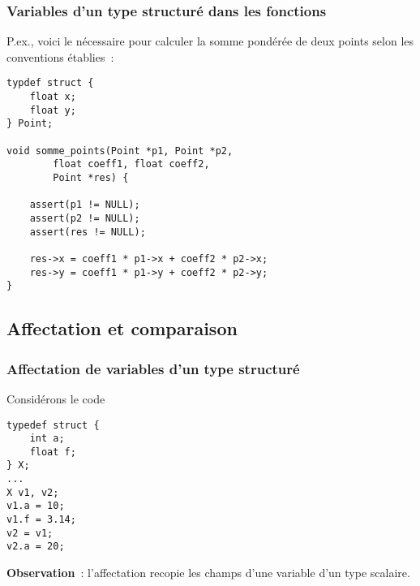 \begin{frame}[fragile]
\frametitle{Variables d'un type structuré dans les fonctions}
P.ex., voici le nécessaire pour calculer la somme pondérée de deux
points selon les conventions établies~:
\begin{lstlisting}
typdef struct {
    float x;
    float y;
} Point;

void somme_points(Point *p1, Point *p2,
        float coeff1, float coeff2,
        Point *res) {

    assert(p1 != NULL);
    assert(p2 != NULL);
    assert(res != NULL);

    res->x = coeff1 * p1->x + coeff2 * p2->x;
    res->y = coeff1 * p1->y + coeff2 * p2->y;
}
\end{lstlisting}
\end{frame}

\subsection{Affectation et comparaison}

\begin{frame}[fragile]
\frametitle{Affectation de variables d'un type structuré}
Considérons le code
\begin{multicols}{2}
\begin{lstlisting}
typedef struct {
    int a;
    float f;
} X;
...
X v1, v2;
v1.a = 10;
v1.f = 3.14;
v2 = v1;
v2.a = 20;
\end{lstlisting}
\end{multicols}
\medskip

\begin{center}
\end{center}
\medskip

{\bf Observation}~: l'affectation recopie les champs d'une variable
d'un type scalaire.
\end{frame}

